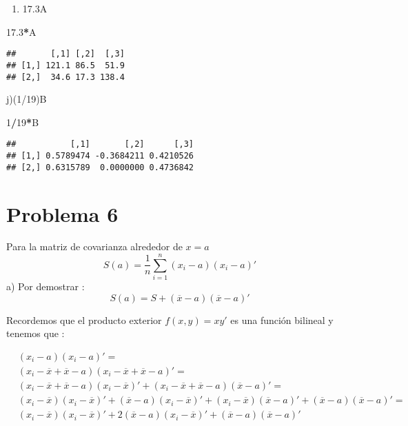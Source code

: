 \documentclass[
]{article}
\newenvironment{Shaded}{\begin{snugshade}}{\end{snugshade}}
\newcommand{\DecValTok}[1]{\textcolor[rgb]{0.00,0.00,0.81}{#1}}
\newcommand{\FloatTok}[1]{\textcolor[rgb]{0.00,0.00,0.81}{#1}}
\newcommand{\NormalTok}[1]{#1}
\newcommand{\OperatorTok}[1]{\textcolor[rgb]{0.81,0.36,0.00}{\textbf{#1}}}
\providecommand{\tightlist}{%
  \setlength{\itemsep}{0pt}\setlength{\parskip}{0pt}}
\begin{document}
\begin{enumerate}
\def\labelenumi{\roman{enumi})}
\tightlist
\item
  17.3A
\end{enumerate}

\begin{Shaded}
\begin{Highlighting}[]
\FloatTok{17.3}\OperatorTok{*}\NormalTok{A}
\end{Highlighting}
\end{Shaded}

\begin{verbatim}
##       [,1] [,2]  [,3]
## [1,] 121.1 86.5  51.9
## [2,]  34.6 17.3 138.4
\end{verbatim}

j)(1/19)B

\begin{Shaded}
\begin{Highlighting}[]
\DecValTok{1}\OperatorTok{/}\DecValTok{19}\OperatorTok{*}\NormalTok{B}
\end{Highlighting}
\end{Shaded}

\begin{verbatim}
##           [,1]       [,2]      [,3]
## [1,] 0.5789474 -0.3684211 0.4210526
## [2,] 0.6315789  0.0000000 0.4736842
\end{verbatim}

\hypertarget{problema-6}{%
\section{Problema 6}\label{problema-6}}

Para la matriz de covarianza alrededor de \(x=a\)
\[S(a) = \frac{1}{n}\sum_{i=1}^{n} (x_{i}-a)(x_{i}-a)' \] a) Por
demostrar : \[S(a) = S + (\overline{x} - a )(\overline{x} - a )' \]

Recordemos que el producto exterior \(f(x,y) = xy'\) es una función
bilineal y tenemos que :

\begin{align*}
&(x_{i}-a)(x_{i}-a)' = \\
&(x_{i}-\overline{x}+\overline{x}-a)(x_{i}-\overline{x}+\overline{x}-a)' = \\ &(x_{i}-\overline{x}+\overline{x}-a)(x_{i}-\overline{x})' + (x_{i}-\overline{x}+\overline{x}-a)(\overline{x}-a)' = \\
&(x_{i}-\overline{x})(x_{i}-\overline{x})'+ (\overline{x}-a)(x_{i}-\overline{x})'+ (x_{i}-\overline{x})(\overline{x}-a)'+ (\overline{x}-a)(\overline{x}-a)' = \\
&(x_{i}-\overline{x})(x_{i}-\overline{x})'+ 2(\overline{x}-a)(x_{i}-\overline{x})'+ (\overline{x}-a)(\overline{x}-a)'
\end{align*}
\end{document}
